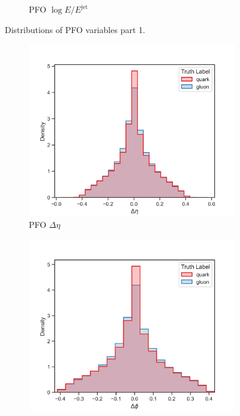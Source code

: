 \begin{figure}[!htb]
\begin{subfigure}[t]{0.49\textwidth}
        \caption{PFO $\log E / E^{\mathrm{jet}}$}
        \label{fig:app_pfo_log_E_over_E_jet}
    \end{subfigure}
\caption{Distributions of PFO variables part 1.}
\label{fig:app_pfo_variables_1}
\end{figure}

\begin{figure}[!htb]
    \begin{subfigure}[t]{0.49\textwidth}
        \includegraphics[width=\linewidth]{src/plots/distributions/PFOs/deltaEta.png}
        \caption{PFO $\Delta\eta$}
        \label{fig:app_pfo_deltaEta}
    \end{subfigure}
    \begin{subfigure}[t]{0.49\textwidth}
        \includegraphics[width=\linewidth]{src/plots/distributions/PFOs/deltaPhi.png}

\end{subfigure}
\end{figure}
